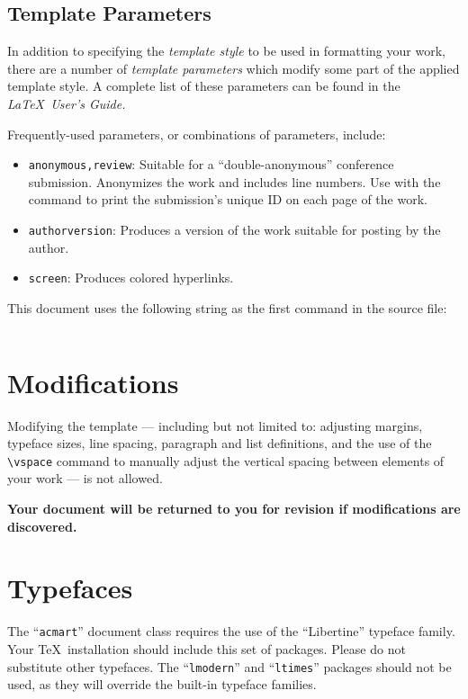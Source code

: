 \documentclass[acmsmall,natbib=false]{acmart}
\begin{document}
\subsection{Template Parameters}

In addition to specifying the {\itshape template style} to be used in
formatting your work, there are a number of {\itshape template parameters}
which modify some part of the applied template style. A complete list
of these parameters can be found in the {\itshape \LaTeX\ User's Guide.}

Frequently-used parameters, or combinations of parameters, include:
\begin{itemize}
    \item {\texttt{anonymous,review}}: Suitable for a ``double-anonymous''
          conference submission. Anonymizes the work and includes line
          numbers. Use with the \texttt{\string\acmSubmissionID} command to print the
          submission's unique ID on each page of the work.
    \item{\texttt{authorversion}}: Produces a version of the work suitable
          for posting by the author.
    \item{\texttt{screen}}: Produces colored hyperlinks.
\end{itemize}

This document uses the following string as the first command in the
source file:
\begin{verbatim}
\end{verbatim}

\section{Modifications}

Modifying the template --- including but not limited to: adjusting
margins, typeface sizes, line spacing, paragraph and list definitions,
and the use of the \verb|\vspace| command to manually adjust the
vertical spacing between elements of your work --- is not allowed.

    {\bfseries Your document will be returned to you for revision if
        modifications are discovered.}

\section{Typefaces}

The ``\verb|acmart|'' document class requires the use of the
``Libertine'' typeface family. Your \TeX\ installation should include
this set of packages. Please do not substitute other typefaces. The
``\verb|lmodern|'' and ``\verb|ltimes|'' packages should not be used,
as they will override the built-in typeface families.
\end{document}
